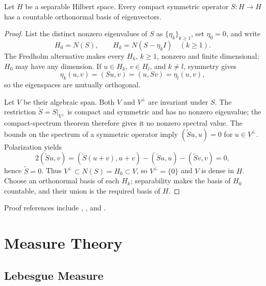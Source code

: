 
\begin{theorem}
\label{thm:eigenvectors-compact-symmetric-operator}
Let $H$ be a separable Hilbert space. Every compact symmetric operator
$S:H\to H$ has a countable orthonormal basis of eigenvectors.
\end{theorem}
\begin{proof}
\sketch List the distinct nonzero eigenvalues of $S$ as $\{\eta_k\}_{k\geq1}$,
set $\eta_0=0$, and write
\[
H_0=N(S),\qquad H_k=N(S-\eta_kI)\quad(k\geq1).
\]
The Fredholm alternative makes every $H_k$, $k\geq1$, nonzero and finite
dimensional; $H_0$ may have any dimension. If $u\in H_k$, $v\in H_l$, and
$k\ne l$, symmetry gives
\[
\eta_k(u,v)=(Su,v)=(u,Sv)=\eta_l(u,v),
\]
so the eigenspaces are mutually orthogonal.

Let $V$ be their algebraic span. Both $V$ and $V^\perp$ are invariant under
$S$. The restriction $\widetilde S=S|_{V^\perp}$ is compact and symmetric and
has no nonzero eigenvalue; the compact-spectrum theorem therefore gives it no
nonzero spectral value. The bounds on the spectrum of a symmetric operator
imply $(\widetilde Su,u)=0$ for $u\in V^\perp$. Polarization yields
\[
2(\widetilde Su,v)
=(\widetilde S(u+v),u+v)-(\widetilde Su,u)-(\widetilde Sv,v)=0,
\]
hence $\widetilde S=0$. Thus $V^\perp\subset N(S)=H_0\subset V$, so
$V^\perp=\{0\}$ and $V$ is dense in $H$. Choose an orthonormal basis of each
$H_k$; separability makes the basis of $H_0$ countable, and their union is the
required basis of $H$.
\end{proof}

Proof references include \cite{Brezis1983}, \cite[Chapter 5]{GilbargTrudinger1983},
and \cite{Yosida1980}.

\section{Measure Theory}
\label{sec:measure-theory}

\subsection{Lebesgue Measure}
\label{sec:lebesgue-measure}

